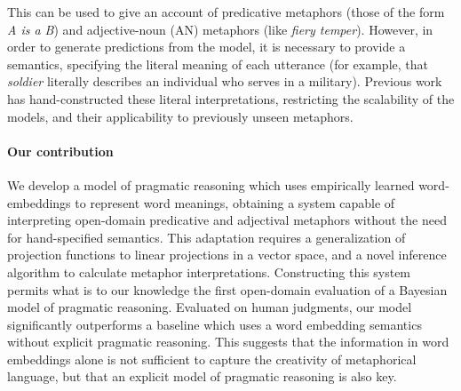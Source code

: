 \documentclass[9pt,twocolumn,twoside,lineno]{pnas-new}
\begin{document}

	


	
% 

	This can be used to give an account of predicative metaphors (those of the form \emph{A is a B}) and adjective-noun (AN) metaphors (like \emph{fiery temper}). However, in order to generate predictions from the model, it is necessary to provide a semantics, specifying the literal meaning of each utterance (for example, that \emph{soldier} literally describes an individual who serves in a military). Previous work has hand-constructed these literal interpretations, restricting the scalability of the models, and their applicability to previously unseen metaphors.

	\paragraph{Our contribution} 


	We develop a model of pragmatic reasoning which uses empirically learned word-embeddings \cite{mikolov2013distributed,pennington2014glove} to represent word meanings, obtaining a system capable of interpreting open-domain predicative and adjectival metaphors without the need for hand-specified semantics. 
	This adaptation requires a generalization of projection functions to linear projections in a vector space, and a novel inference algorithm to calculate metaphor interpretations.
	Constructing this system permits what is to our knowledge the first open-domain evaluation of a Bayesian model of pragmatic reasoning.
	Evaluated on human judgments, our model significantly outperforms a baseline which uses a word embedding semantics without explicit pragmatic reasoning. This suggests that the information in word embeddings alone is not sufficient to capture the creativity of metaphorical language, but that an explicit model of pragmatic reasoning is also key.
\end{document}
